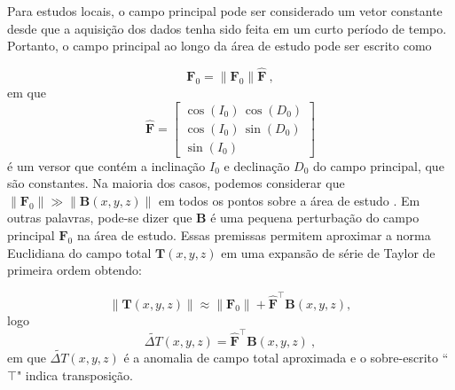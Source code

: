 Para estudos locais, o campo principal pode ser considerado um vetor constante desde que a aquisição dos dados tenha sido feita em um curto período de tempo. Portanto, o campo principal ao longo da área de estudo pode ser escrito como

\begin{equation}
\mathbf{F}_{0} = \| \mathbf{F}_{0} \| \hat{\mathbf{F}} \: ,
\label{eq:geomagnetic_field_F0}
\end{equation}
em que
\begin{equation}
\hat{\mathbf{F}} = \left[
\begin{array}{c}
\cos(I_{0}) \, \cos(D_{0}) \\
\cos(I_{0}) \, \sin(D_{0}) \\
\sin(I_{0})
\end{array} \right]
\label{eq:unit_vector_F}
\end{equation}
é um versor que contém a inclinação $I_{0}$ e declinação $D_{0}$ do campo principal, que são constantes.
Na maioria dos casos, podemos considerar que $\|\mathbf{F}_0\| \gg \| \mathbf{B}(x, y, z) \|$ em todos os pontos sobre a área de estudo \citep{blakely1996}.
Em outras palavras, pode-se dizer que $\mathbf{B}$ é uma pequena perturbação do campo principal $\mathbf{F}_0$ na área de estudo. Essas premissas permitem aproximar a norma Euclidiana do campo total $\mathbf{T}(x, y, z)$ em uma expansão de série de Taylor de primeira ordem obtendo:

\begin{equation}\label{eq:taylorexp}
\|\mathbf{T}(x, y, z)\| \approx \|\mathbf{F}_0\| + \hat{\mathbf{F}}^{\top}\mathbf{B}(x, y, z) ,
\end{equation}
logo
\begin{equation}
\tilde{\Delta T}(x, y, z) = \hat{\mathbf{F}}^{\top} \mathbf{B}(x, y, z) \: ,
\label{eq:tfanomaly}
\end{equation}
em que $ \tilde{\Delta T}(x, y, z) $ é a anomalia de campo total aproximada e o sobre-escrito ``$ \top $" indica transposição.


